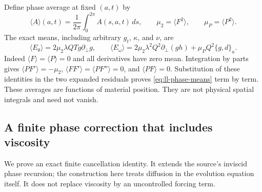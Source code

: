 Define phase average at fixed $(a,t)$ by
\[
\langle A\rangle(a,t)=\frac1{2\pi}\int_0^{2\pi}A(s,a,t)\,ds,
\qquad \mu_2=\langle F^2\rangle,\qquad \mu_P=\langle P^2\rangle.
\]
The exact means, including arbitrary $g_t$, $\kappa$, and $\nu$, are
\begin{equation}
\langle E_\theta\rangle=2\mu_2\lambda QTg\partial_\perp g,
\qquad
\langle E_\omega\rangle
=2\mu_2\lambda^2Q^2\partial_\perp(gh)
 +\mu_PQ^2\{g,d\}_a.
\label{eq:ll-phase-means}
\end{equation}
Indeed $\langle F\rangle=\langle P\rangle=0$ and all derivatives
have zero mean. Integration by parts gives
$\langle PF'\rangle=-\mu_2$,
$\langle FF'\rangle=\langle PF''\rangle=0$, and
$\langle PF\rangle=0$. Substitution of these identities in the two
expanded residuals proves \eqref{eq:ll-phase-means} term by term.
These averages are functions of material position. They are not
physical spatial integrals and need not vanish.

\subsection{A finite phase correction that includes viscosity}

We prove an exact finite cancellation identity. It extends the source's
inviscid phase recursion; the construction here treats diffusion in the
evolution equation itself. It does not replace viscosity by an
uncontrolled forcing term.

